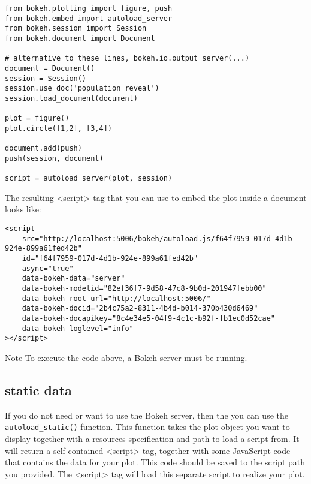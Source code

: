 \begin{framed}
\begin{verbatim}
from bokeh.plotting import figure, push
from bokeh.embed import autoload_server
from bokeh.session import Session
from bokeh.document import Document

# alternative to these lines, bokeh.io.output_server(...)
document = Document()
session = Session()
session.use_doc('population_reveal')
session.load_document(document)

plot = figure()
plot.circle([1,2], [3,4])

document.add(push)
push(session, document)

script = autoload_server(plot, session)
\end{verbatim}
\end{framed}
The resulting <script> tag that you can use to embed the plot inside a document looks like:
\begin{framed}
\begin{verbatim}
<script
    src="http://localhost:5006/bokeh/autoload.js/f64f7959-017d-4d1b-924e-899a61fed42b"
    id="f64f7959-017d-4d1b-924e-899a61fed42b"
    async="true"
    data-bokeh-data="server"
    data-bokeh-modelid="82ef36f7-9d58-47c8-9b0d-201947febb00"
    data-bokeh-root-url="http://localhost:5006/"
    data-bokeh-docid="2b4c75a2-8311-4b4d-b014-370b430d6469"
    data-bokeh-docapikey="8c4e34e5-04f9-4c1c-b92f-fb1ec0d52cae"
    data-bokeh-loglevel="info"
></script>
\end{verbatim}
\end{framed}
Note
To execute the code above, a Bokeh server must be running.
\subsection{static data}
If you do not need or want to use the Bokeh server, then the you can use the \texttt{autoload\_static()} function. This function takes the plot object you want to display together with a resources specification and path to load a script from. It will return a self-contained <script> tag, together with some JavaScript code that contains the data for your plot. This code should be saved to the script path you provided. The <script> tag will load this separate script to realize your plot.

